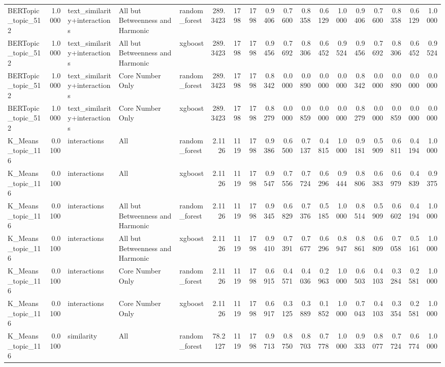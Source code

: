 \begin{tabular}{lrlllrrrrrrrrrrrrr}
BERTopic_topic_512 & 1.0000 & text_similarity+interactions & All but Betweenness and Harmonic & random_forest & 289.3423 & 1798 & 1798 & 0.9406 & 0.7600 & 0.8358 & 0.6129 & 1.0000 & 0.9406 & 0.7600 & 0.8358 & 0.6129 & 1.0000 \\
BERTopic_topic_512 & 1.0000 & text_similarity+interactions & All but Betweenness and Harmonic & xgboost & 289.3423 & 1798 & 1798 & 0.9456 & 0.7692 & 0.8306 & 0.6452 & 0.9524 & 0.9456 & 0.7692 & 0.8306 & 0.6452 & 0.9524 \\
BERTopic_topic_512 & 1.0000 & text_similarity+interactions & Core Number Only & random_forest & 289.3423 & 1798 & 1798 & 0.8342 & 0.0000 & 0.0890 & 0.0000 & 0.0000 & 0.8342 & 0.0000 & 0.0890 & 0.0000 & 0.0000 \\
BERTopic_topic_512 & 1.0000 & text_similarity+interactions & Core Number Only & xgboost & 289.3423 & 1798 & 1798 & 0.8279 & 0.0000 & 0.0859 & 0.0000 & 0.0000 & 0.8279 & 0.0000 & 0.0859 & 0.0000 & 0.0000 \\
K_Means_topic_116 & 0.0100 & interactions & All & random_forest & 2.1126 & 1119 & 1798 & 0.9386 & 0.6500 & 0.7137 & 0.4815 & 1.0000 & 0.9181 & 0.5909 & 0.6811 & 0.4194 & 1.0000 \\
K_Means_topic_116 & 0.0100 & interactions & All & xgboost & 2.1126 & 1119 & 1798 & 0.9547 & 0.7556 & 0.7724 & 0.6296 & 0.9444 & 0.8806 & 0.6383 & 0.6979 & 0.4839 & 0.9375 \\
K_Means_topic_116 & 0.0100 & interactions & All but Betweenness and Harmonic & random_forest & 2.1126 & 1119 & 1798 & 0.9345 & 0.6829 & 0.7376 & 0.5185 & 1.0000 & 0.8514 & 0.5909 & 0.6602 & 0.4194 & 1.0000 \\
K_Means_topic_116 & 0.0100 & interactions & All but Betweenness and Harmonic & xgboost & 2.1126 & 1119 & 1798 & 0.9410 & 0.7391 & 0.7677 & 0.6296 & 0.8947 & 0.8861 & 0.6809 & 0.7058 & 0.5161 & 1.0000 \\
K_Means_topic_116 & 0.0100 & interactions & Core Number Only & random_forest & 2.1126 & 1119 & 1798 & 0.6915 & 0.4571 & 0.4036 & 0.2963 & 1.0000 & 0.6503 & 0.4103 & 0.3284 & 0.2581 & 1.0000 \\
K_Means_topic_116 & 0.0100 & interactions & Core Number Only & xgboost & 2.1126 & 1119 & 1798 & 0.6917 & 0.3125 & 0.3889 & 0.1852 & 1.0000 & 0.7043 & 0.4103 & 0.3354 & 0.2581 & 1.0000 \\
K_Means_topic_116 & 0.0100 & similarity & All & random_forest & 78.2127 & 1119 & 1798 & 0.9713 & 0.8750 & 0.8703 & 0.7778 & 1.0000 & 0.9333 & 0.8077 & 0.7724 & 0.6774 & 1.0000 \\

\end{tabular}
